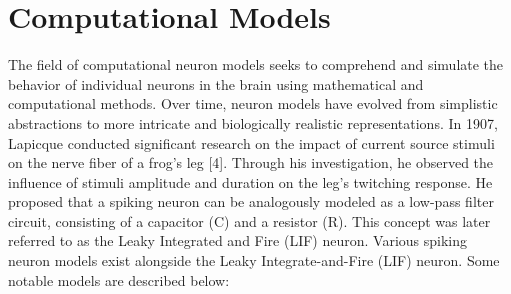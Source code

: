 \section{Computational Models}

The field of computational neuron models seeks to comprehend and simulate the behavior of individual neurons in the brain using mathematical and computational methods. Over time, neuron models have evolved from simplistic abstractions to more intricate and biologically realistic representations. In 1907, Lapicque \cite{abbott1999lapicque} conducted significant research on the impact of current source stimuli on the nerve fiber of a frog's leg [4]. Through his investigation, he observed the influence of stimuli amplitude and duration on the leg's twitching response. He proposed that a spiking neuron can be analogously modeled as a low-pass filter circuit, consisting of a capacitor (C) and a resistor (R). This concept was later referred to as the Leaky Integrated and Fire (LIF) neuron.
Various spiking neuron models exist alongside the Leaky Integrate-and-Fire (LIF) neuron. Some notable models are described below:

